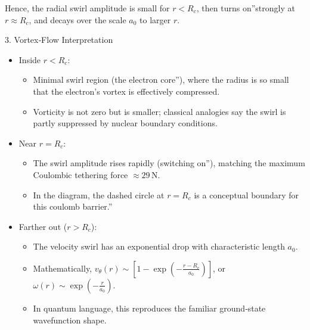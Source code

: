 Hence, the radial swirl amplitude is small for \(r < R_c\), then \grqq turns on\textquotedblright strongly at \(r \approx R_c\), and decays over the scale \(a_0\) to larger \(r\).

3. Vortex‐Flow Interpretation

\begin{itemize}
    \item Inside \(r < R_c\):

        \begin{itemize}
            \item Minimal swirl region (the \grqq electron core\textquotedblright), where the radius is so small that the electron's vortex is effectively compressed.

            \item Vorticity is not zero but is smaller; classical analogies say the swirl is partly suppressed by nuclear boundary conditions.
        \end{itemize}

    \item Near \(r = R_c\):

        \begin{itemize}
            \item The swirl amplitude rises rapidly (\grqq switching on\textquotedblright), matching the maximum Coulombic tethering force \(\approx 29\,\mathrm{N}\).

            \item In the diagram, the dashed circle at \(r = R_c\) is a conceptual boundary for this \grqq coulomb barrier.\textquotedblright
        \end{itemize}

    \item Farther out (\(r > R_c\)):

    \begin{itemize}
        \item The velocity swirl has an exponential drop with characteristic length \(a_0\).

        \item Mathematically, \(v_\theta(r) \sim [1 - \exp(-\frac{r - R_c}{a_0})]\), or \(\omega(r) \sim \exp(-\frac{r}{a_0})\).

        \item In quantum language, this reproduces the familiar ground‐state wavefunction shape.
    \end{itemize}
\end{itemize}




